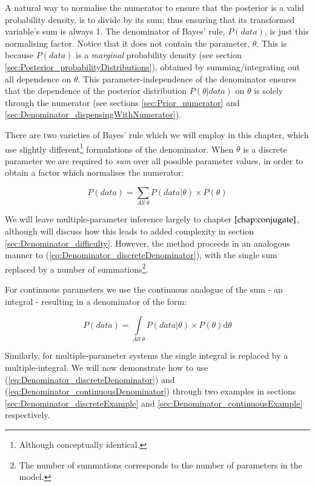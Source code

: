 \documentclass[11pt,fullpage]{book}
\begin{document}
A natural way to normalise the numerator to ensure that the posterior is a valid probability density, is to divide by its sum; thus ensuring that its transformed variable's sum is always 1. The denominator of Bayes' rule, $P(data)$, is just this normalising factor. Notice that it does not contain the parameter, $\theta$. This is because $P(data)$ is a \textit{marginal} probability density (see section \ref{sec:Posterior_probabilityDistributions}), obtained by summing/integrating out all dependence on $\theta$. This parameter-independence of the denominator ensures that the dependence of the posterior distribution $P(\theta|data)$ on $\theta$ is solely through the numerator (see sections \ref{sec:Prior_numerator} and \ref{sec:Denominator_dispensingWithNumerator}). 

There are two varieties of Bayes' rule which we will employ in this chapter, which use slightly different\footnote{Although conceptually identical.} formulations of the denominator. When $\theta$ is a discrete parameter we are required to \textit{sum} over all possible parameter values, in order to obtain a factor which normalises the numerator:

\begin{equation}\label{eq:Denominator_discreteDenominator}
P(data) = \sum\limits_{All\;\theta} P(data|\theta) \times P(\theta)
\end{equation}

We will leave multiple-parameter inference largely to chapter $\ref{chap:conjugate}$, although will discuss how this leads to added complexity in section \ref{sec:Denominator_difficulty}. However, the method proceeds in an analogous manner to (\ref{eq:Denominator_discreteDenominator}), with the single sum replaced by a number of summations\footnote{The number of summations corresponds to the number of parameters in the model.}.

For continuous parameters we use the continuous analogue of the sum - an integral - resulting in a denominator of the form:

\begin{equation}\label{eq:Denominator_continuousDenominator}
P(data) = \int\limits_{All\;\theta} P(data|\theta) \times P(\theta) \mathrm{d}\theta
\end{equation}

Similarly, for multiple-parameter systems the single integral is replaced by a multiple-integral. We will now demonstrate how to use (\ref{eq:Denominator_discreteDenominator}) and (\ref{eq:Denominator_continuousDenominator}) through two examples in sections \ref{sec:Denominator_discreteExample} and \ref{sec:Denominator_continuousExample} respectively.
\end{document}
